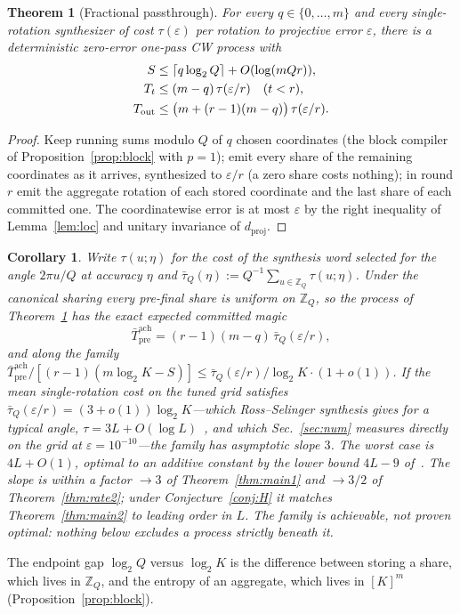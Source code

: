 \documentclass[aps,prx,twocolumn,superscriptaddress,nofootinbib,longbibliography]{revtex4-2}
\theoremstyle{plain}
\newtheorem{theorem}{Theorem}
\newtheorem{corollary}{Corollary}
\theoremstyle{definition}
\theoremstyle{remark}
\newcommand{\dproj}{d_{\mathrm{proj}}}
\newcommand{\Tpre}{T_{\mathrm{pre}}}
\newcommand{\Tout}{T_{\mathrm{out}}}
\newcommand{\Z}{\mathbb{Z}}
\begin{document}
\begin{theorem}[Fractional passthrough]\label{thm:frontier}
For every $q\in\{0,\dots,m\}$ and every single-rotation synthesizer of cost $\tau(\varepsilon)$ per rotation to projective error $\varepsilon$, there is a deterministic zero-error one-pass CW process with
\begin{align}
S&\le\lceil q\log_2Q\rceil+O(\log(mQr)),\notag\\
T_t&\le(m-q)\,\tau(\varepsilon/r)\quad(t<r),\notag\\
\Tout&\le\big(m+(r-1)(m-q)\big)\,\tau(\varepsilon/r).
\end{align}
\end{theorem}
\begin{proof}
Keep running sums modulo $Q$ of $q$ chosen coordinates (the block compiler of Proposition~\ref{prop:block} with $p=1$); emit every share of the remaining coordinates as it arrives, synthesized to $\varepsilon/r$ (a zero share costs nothing); in round $r$ emit the aggregate rotation of each stored coordinate and the last share of each committed one. The coordinatewise error is at most $\varepsilon$ by the right inequality of Lemma~\ref{lem:loc} and unitary invariance of $\dproj$.
\end{proof}

\begin{corollary}\label{cor:frontier}
Write $\tau(u;\eta)$ for the cost of the synthesis word selected for the angle $2\pi u/Q$ at accuracy $\eta$ and $\bar\tau_Q(\eta):=Q^{-1}\sum_{u\in\Z_Q}\tau(u;\eta)$. Under the canonical sharing every pre-final share is uniform on $\Z_Q$, so the process of Theorem~\ref{thm:frontier} has the exact expected committed magic
\begin{equation}\label{eq:achexp}
\bar\Tpre^{\mathrm{ach}}=(r-1)(m-q)\,\bar\tau_Q(\varepsilon/r),
\end{equation}
and along the family $\bar\Tpre^{\mathrm{ach}}/[(r-1)(m\log_2K-S)]\le\bar\tau_Q(\varepsilon/r)/\log_2K\cdot(1+o(1))$. If the mean single-rotation cost on the tuned grid satisfies $\bar\tau_Q(\varepsilon/r)=(3+o(1))\log_2K$---which Ross--Selinger synthesis gives for a typical angle, $\tau=3L+O(\log L)$~\cite{RossSelinger}, and which Sec.~\ref{sec:num} measures directly on the grid at $\varepsilon=10^{-10}$---the family has asymptotic slope $3$. The worst case is $4L+O(1)$, optimal to an additive constant by the lower bound $4L-9$ of~\cite[Thm.~30]{Selinger15}. The slope is within a factor $\to3$ of Theorem~\ref{thm:main1} and $\to3/2$ of Theorem~\ref{thm:rate2}; under Conjecture~\ref{conj:H} it matches Theorem~\ref{thm:main2} to leading order in $L$. The family is achievable, not proven optimal: nothing below excludes a process strictly beneath it.
\end{corollary}
The endpoint gap $\log_2Q$ versus $\log_2K$ is the difference between storing a share, which lives in $\Z_Q$, and the entropy of an aggregate, which lives in $[K]^m$ (Proposition~\ref{prop:block}).
\end{document}

